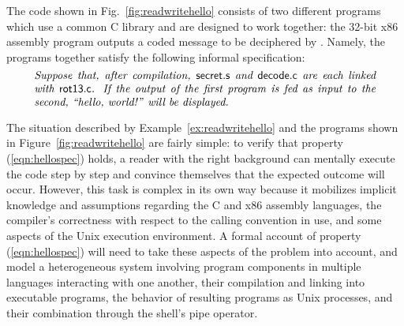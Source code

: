 \begin{example} \label{ex:readwritehello} %
The code shown in Fig.~\ref{fig:readwritehello}
consists of two different programs which
use a common C library and
are designed to work together:
the 32-bit x86 assembly program  
outputs a coded message
to be deciphered by .
Namely,
the programs together satisfy the following informal specification:
\begin{equation}
  \begin{minipage}{.9\textwidth}
  \it
  Suppose that,
  after compilation,
  \kw{secret.s} and \kw{decode.c}
  are each linked with \kw{rot13.c}.
  If the output of the first program
  is fed as input to the second,
  ``hello, world!'' will be displayed.
  \end{minipage}
  \label{eqn:hellospec}
\end{equation}
\end{example}

The situation described by Example~\ref{ex:readwritehello}
and the programs shown in Figure~\ref{fig:readwritehello}
are fairly simple:
to verify that property (\ref{eqn:hellospec}) holds,
a reader with the right background
can mentally execute the code step by step
and convince themselves that the expected outcome will occur.
However, this task is complex in its own way
because it mobilizes implicit knowledge and assumptions regarding
the C and x86 assembly languages,
the compiler's correctness with respect to the calling convention in use,
and some aspects of the Unix execution environment.
A formal account of property (\ref{eqn:hellospec})
will need to take these aspects of the problem into account,
and model a heterogeneous system involving
program components in multiple languages
interacting with one another,
their compilation and linking into executable programs,
the behavior of resulting programs as Unix processes,
and their combination through the shell's pipe operator.


